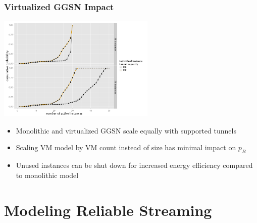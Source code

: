 \documentclass{beamer}
\begin{document}





\begin{frame}
	\frametitle{Virtualized GGSN Impact}

	\begin{center}
		\includegraphics[height=5cm]{../../chapters/041-mobilenetsmeasuring/images/R-virtualized-instanceuse.pdf}
	\end{center}

	\begin{itemize}
		\item Monolithic and virtualized GGSN scale equally with supported tunnels
		\item Scaling VM model by VM count instead of size has minimal impact on $p_B$
		\item Unused instances can be shut down for increased energy efficiency compared to monolithic model
	\end{itemize}
\end{frame}





\section{Modeling Reliable Streaming}
\end{document}
